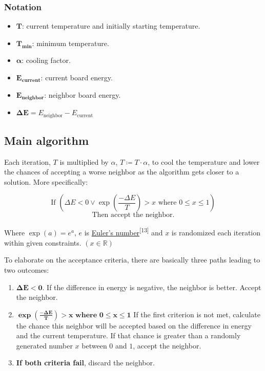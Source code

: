\documentclass{article}
\begin{document}
\subsubsection{Notation}

\begin{itemize}
    \item \(\boldsymbol{T}\): current temperature and initially starting temperature.
    \item \(\boldsymbol{T_{\mathbf{min}}}\): minimum temperature.
    \item \(\boldsymbol{\alpha}\): cooling factor.
    \item \(\boldsymbol{E_{\mathbf{current}}}\): current board energy.
    \item \(\boldsymbol{E_{\mathbf{neighbor}}}\): neighbor board energy.
    \item \(\boldsymbol{\Delta E} = E_{\text{neighbor}} - E_{\text{current}}\)
\end{itemize}

\subsection{Main algorithm}

Each iteration, \(T\) is multiplied by \(\alpha\), \(T \coloneqq T \cdot \alpha\),
to cool the temperature and lower the chances of accepting a worse neighbor as the algorithm gets closer to a solution. More specifically:

\[
    \text{If } \left(\Delta E < 0 \lor \exp\left(\frac{-\Delta E}{T}\right) > x \text{ where } 0 \leq x \leq 1 \right)
\]
\[
    \text{Then accept the neighbor.}
\]

Where \( \exp(a) = e^a \), \( e \) is \href{https://en.wikipedia.org/wiki/E_(mathematical_constant)}{Euler's number}\textsuperscript{[13]}
and \( x \) is randomized each iteration within given constraints. \((x \in \mathbb{R})\)

To elaborate on the acceptance criteria, there are basically three paths leading to two outcomes:

\begin{enumerate}
    \item \(\boldsymbol{\Delta E < 0}\). If the difference in energy is negative, the neighbor is better. Accept the neighbor.
    \item \(\boldsymbol{\exp\left(\frac{-\Delta E}{T}\right) > x \textbf{ where } 0 \leq x \leq 1}\)
          If the first criterion is not met, calculate the chance this neighbor will be accepted based on the difference in energy and
          the current temperature. If that chance is greater than a randomly generated number \(x\) between \(0\) and \(1\), accept the neighbor.
    \item \textbf{If both criteria fail}, discard the neighbor.
\end{enumerate}
\end{document}
